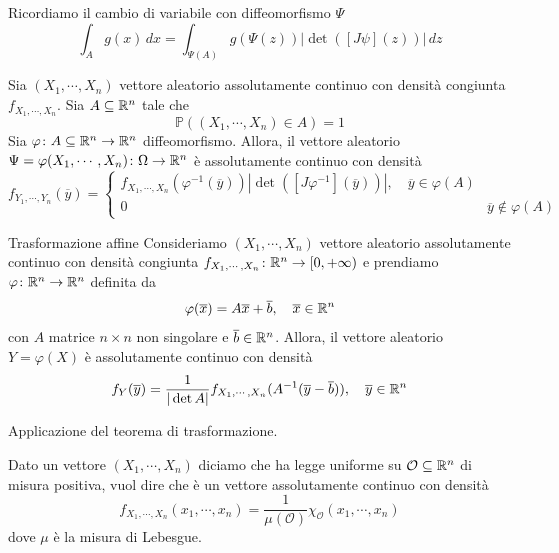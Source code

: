 \documentclass[a4paper]{article}
\begin{document}
Ricordiamo il cambio di variabile con diffeomorfismo \(\Psi\)
\[
    \int_A g(x)\,dx = \int_{\Psi(A)} g(\Psi(z))
    |\det([J\psi](z))|\,dz
\]

\begin{snippetproposition}{}
    Sia \((X_1, \cdots, X_n)\) vettore aleatorio assolutamente continuo
    con densità congiunta \(f_{X_1, \cdots, X_n}\).
    Sia \(A \subseteq \mathbb{R}^n\) tale che
    \[
        \mathbb P((X_1, \cdots, X_n) \in A) = 1
    \]
    Sia \(\varphi \colon A \subseteq \mathbb{R}^n \to \mathbb{R}^n\)
    diffeomorfismo.
    Allora, il vettore aleatorio \(\Psi = \varphi(X_1, \cdots, X_n)\colon \Omega \to \mathbb{R}^n\)
    è assolutamente continuo con densità
    \[
        f_{Y_1, \cdots, Y_n}(\overline y)
        =
        \begin{cases}
            f_{X_1, \cdots, X_n}(\varphi^{-1}(\overline y)) |\det([J\varphi^{-1}](\overline y))|, \quad \overline y \in \varphi(A) \\
            0 & \overline y \notin \varphi(A)
        \end{cases}
    \]
\end{snippetproposition}

\begin{snippetproposition}{Trasformazione affine}
    Consideriamo \((X_1, \cdots, X_n)\) vettore aleatorio assolutamente continuo con densità
    congiunta \(f_{X_1, \cdots, X_n} \colon \mathbb{R}^n \to [0,+\infty)\)
    e prendiamo \(\varphi \colon \mathbb{R}^n \to \mathbb{R}^n\) definita da
    \[
        \varphi(\overline x) = A\overline x + \overline b, \quad \overline x \in \mathbb{R}^n
    \]
    con \(A\) matrice \(n \times n\) non singolare e \(\overline b \in \mathbb{R}^n\).
    Allora, il vettore aleatorio \(Y = \varphi(X)\)
    è assolutamente continuo con densità
    \[
        f_Y(\overline y) = \frac{1}{|\det A|} f_{X_1,\cdots,X_n}(A^{-1}(\overline y - \overline b)), \quad
        \overline y \in \mathbb{R}^n
    \]
\end{snippetproposition}

Applicazione del teorema di trasformazione.

\begin{snippetdefinition}{}
    Dato un vettore \((X_1, \cdots, X_n)\) diciamo che ha legge uniforme
    su \(\mathcal O \subseteq \mathbb{R}^n\) di misura positiva, vuol dire che è un vettore assolutamente
    continuo con densità \[
        f_{X_1, \cdots, X_n}(x_1, \cdots, x_n) = \frac{1}{\mu(\mathcal O)} \chi_{\mathcal O}(x_1, \cdots, x_n)
    \]
    dove \(\mu\) è la misura di Lebesgue.
\end{snippetdefinition}
\end{document}
